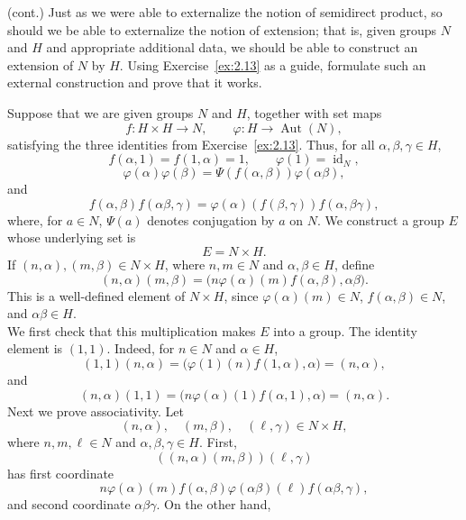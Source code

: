 \documentclass[../Odyssey_Project.tex]{subfiles}
\begin{document}
\begin{exercise}
\label{ex:2.14}
(cont.) Just as we were able to externalize the notion of semidirect product, so should we be able to externalize the notion of extension; that is, given groups $N$ and $H$ and appropriate additional data, we should be able to construct an extension of $N$ by $H$. Using Exercise~\ref{ex:2.13} as a guide, formulate such an external construction and prove that it works.
\end{exercise}
\begin{solution}
    Suppose that we are given groups $N$ and $H$, together with set maps
    \[
        f \colon H \times H \to N,
        \qquad
        \varphi \colon H \to \operatorname{Aut}(N),
    \]
    satisfying the three identities from Exercise~\ref{ex:2.13}. Thus, for all $\alpha,\beta,\gamma \in H$,
    \[
        f(\alpha,1) = f(1,\alpha) = 1,
        \qquad
        \varphi(1) = \operatorname{id}_N,
    \]
    \[
        \varphi(\alpha)\varphi(\beta)
        =
        \Psi(f(\alpha,\beta))\varphi(\alpha\beta),
    \]
    and
    \[
        f(\alpha,\beta)f(\alpha\beta,\gamma)
        =
        \varphi(\alpha)(f(\beta,\gamma))f(\alpha,\beta\gamma),
    \]
    where, for $a \in N$, $\Psi(a)$ denotes conjugation by $a$ on $N$. We construct a group $E$ whose underlying set is
    \[
        E = N \times H.
    \]
    If $(n,\alpha),(m,\beta) \in N \times H$, where $n,m \in N$ and $\alpha,\beta \in H$, define
    \[
        (n,\alpha)(m,\beta)
        =
        \bigl(n\varphi(\alpha)(m)f(\alpha,\beta),\alpha\beta\bigr).
    \]
    This is a well-defined element of $N \times H$, since $\varphi(\alpha)(m) \in N$, $f(\alpha,\beta) \in N$, and $\alpha\beta \in H$. \\
    We first check that this multiplication makes $E$ into a group. The identity element is $(1,1)$. Indeed, for $n \in N$ and $\alpha \in H$,
    \[
        (1,1)(n,\alpha)
        =
        \bigl(\varphi(1)(n)f(1,\alpha),\alpha\bigr)
        =
        (n,\alpha),
    \]
    and
    \[
        (n,\alpha)(1,1)
        =
        \bigl(n\varphi(\alpha)(1)f(\alpha,1),\alpha\bigr)
        =
        (n,\alpha).
    \]
    Next we prove associativity. Let
    \[
        (n,\alpha),\quad (m,\beta),\quad (\ell,\gamma) \in N \times H,
    \]
    where $n,m,\ell \in N$ and $\alpha,\beta,\gamma \in H$. First,
    \[
        ((n,\alpha)(m,\beta))(\ell,\gamma)
    \]
    has first coordinate
    \[
        n\varphi(\alpha)(m)f(\alpha,\beta)\varphi(\alpha\beta)(\ell)f(\alpha\beta,\gamma),
    \]
    and second coordinate $\alpha\beta\gamma$. On the other hand,

\end{solution}
\end{document}
